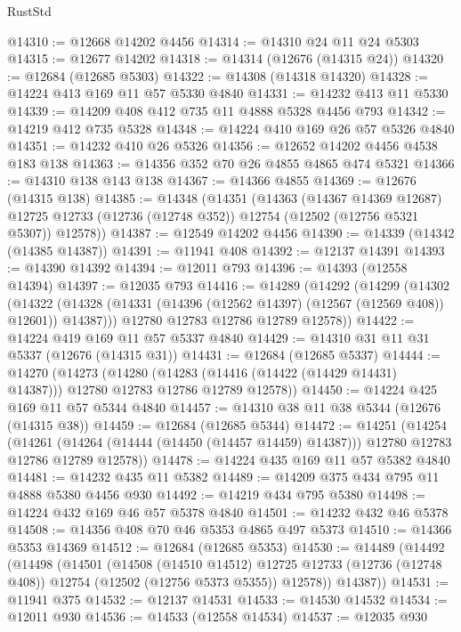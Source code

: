 \begin{lexlean}{RustStd}
\begin{coremodule}
@14310 := @12668 @14202 @4456
@14314 := @14310 @24 @11 @24 @5303
@14315 := @12677 @14202
@14318 := @14314 (@12676 (@14315 @24))
@14320 := @12684 (@12685 @5303)
@14322 := @14308 (@14318 @14320)
@14328 := @14224 @413 @169 @11 @57 @5330 @4840
@14331 := @14232 @413 @11 @5330
@14339 := @14209 @408 @412 @735 @11 @4888 @5328 @4456 @793
@14342 := @14219 @412 @735 @5328
@14348 := @14224 @410 @169 @26 @57 @5326 @4840
@14351 := @14232 @410 @26 @5326
@14356 := @12652 @14202 @4456 @4538 @183 @138
@14363 := @14356 @352 @70 @26 @4855 @4865 @474 @5321
@14366 := @14310 @138 @143 @138
@14367 := @14366 @4855
@14369 := @12676 (@14315 @138)
@14385 := @14348
    (@14351
      (@14363
        (@14367 @14369 @12687)
        @12725
        @12733
        (@12736 (@12748 @352))
        @12754
        (@12502 (@12756 @5321 @5307))
        @12578))
@14387 := @12549 @14202 @4456
@14390 := @14339 (@14342 (@14385 @14387))
@14391 := @11941 @408
@14392 := @12137 @14391
@14393 := @14390 @14392
@14394 := @12011 @793
@14396 := @14393 (@12558 @14394)
@14397 := @12035 @793
@14416 := @14289
    (@14292
      (@14299
        (@14302
          (@14322 (@14328 (@14331 (@14396 (@12562 @14397) (@12567 (@12569 @408)) @12601)) @14387)))
        @12780
        @12783
        @12786
        @12789
        @12578))
@14422 := @14224 @419 @169 @11 @57 @5337 @4840
@14429 := @14310 @31 @11 @31 @5337 (@12676 (@14315 @31))
@14431 := @12684 (@12685 @5337)
@14444 := @14270
    (@14273
      (@14280 (@14283 (@14416 (@14422 (@14429 @14431) @14387))) @12780 @12783 @12786 @12789 @12578))
@14450 := @14224 @425 @169 @11 @57 @5344 @4840
@14457 := @14310 @38 @11 @38 @5344 (@12676 (@14315 @38))
@14459 := @12684 (@12685 @5344)
@14472 := @14251
    (@14254
      (@14261 (@14264 (@14444 (@14450 (@14457 @14459) @14387))) @12780 @12783 @12786 @12789 @12578))
@14478 := @14224 @435 @169 @11 @57 @5382 @4840
@14481 := @14232 @435 @11 @5382
@14489 := @14209 @375 @434 @795 @11 @4888 @5380 @4456 @930
@14492 := @14219 @434 @795 @5380
@14498 := @14224 @432 @169 @46 @57 @5378 @4840
@14501 := @14232 @432 @46 @5378
@14508 := @14356 @408 @70 @46 @5353 @4865 @497 @5373
@14510 := @14366 @5353 @14369
@14512 := @12684 (@12685 @5353)
@14530 := @14489
    (@14492
      (@14498
        (@14501
          (@14508
            (@14510 @14512)
            @12725
            @12733
            (@12736 (@12748 @408))
            @12754
            (@12502 (@12756 @5373 @5355))
            @12578))
        @14387))
@14531 := @11941 @375
@14532 := @12137 @14531
@14533 := @14530 @14532
@14534 := @12011 @930
@14536 := @14533 (@12558 @14534)
@14537 := @12035 @930

\end{coremodule}
\end{lexlean}
